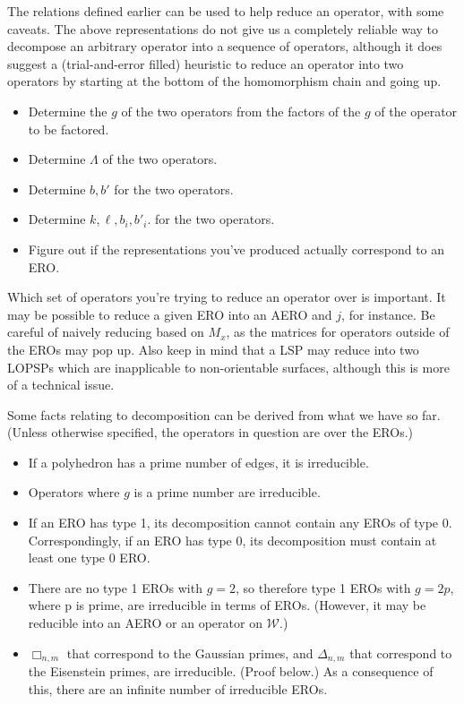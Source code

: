 \documentclass[12pt]{amsart}%
\begin{document}
The relations defined earlier can be used to help reduce an operator,
with some caveats. The above representations do not give us a completely
reliable way to decompose an arbitrary operator into a sequence of operators,
although it does suggest a (trial-and-error filled) heuristic to reduce an
operator into two operators by starting at the bottom of the homomorphism chain
and going up.

\begin{itemize}
  \item Determine the $g$ of the two operators from the factors of the
    $g$ of the operator to be factored.
  \item Determine $\Lambda$ of the two operators.
  \item Determine $b, b'$ for the two operators.
  \item Determine $k, \ell, b_i, b'_i$. for the two operators.
  \item Figure out if the representations you've produced
    actually correspond to an ERO.
\end{itemize}

Which set of operators you're trying to reduce an operator over is important.
It may be possible to reduce a given ERO into an AERO and $j$, for instance.
Be careful of naively reducing based on $M_x$, as the matrices for operators
outside of the EROs may pop up. Also keep in mind that a LSP may reduce into
two LOPSPs which are inapplicable to non-orientable surfaces, although this is
more of a technical issue.

Some facts relating to decomposition can be derived from what we have
so far.
(Unless otherwise specified, the operators in question are over the EROs.)

\begin{itemize}
\item If a polyhedron has a prime number of edges, it is irreducible.
\item Operators where $g$ is a prime number are irreducible.
\item If an ERO has type 1, its decomposition cannot contain
any EROs of type 0. Correspondingly, if an ERO has type 0,
its decomposition must contain at least one type 0 ERO.
\item There are no type 1 EROs with $g=2$, so therefore type 1 EROs
  with $g=2p$, where p is prime, are irreducible in terms of EROs.
  (However, it may be reducible into an AERO or an operator on $\mathcal{W}$.)
\item $\Box_{n,m}$ that correspond to the Gaussian primes,
  and $\Delta_{n,m}$ that correspond to the Eisenstein primes,
  are irreducible. (Proof below.)
  As a consequence of this, there are an infinite number of irreducible EROs.
\end{itemize}
\end{document}
